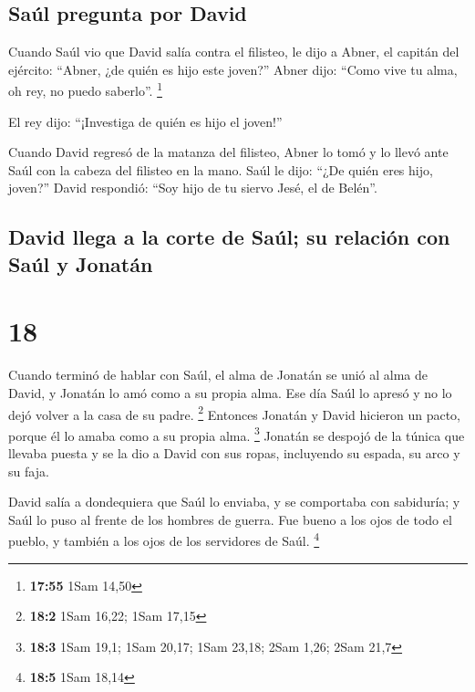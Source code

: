 \hypertarget{sauxfal-pregunta-por-david}{%
\subsection{Saúl pregunta por David}\label{sauxfal-pregunta-por-david}}

 Cuando Saúl vio que David salía contra el filisteo, le
dijo a Abner, el capitán del ejército: ``Abner, ¿de quién es hijo este
joven?'' Abner dijo: ``Como vive tu alma, oh rey, no puedo saberlo''.
\footnote{\textbf{17:55} 1Sam 14,50}

 El rey dijo: ``¡Investiga de quién es hijo el joven!''

 Cuando David regresó de la matanza del filisteo, Abner
lo tomó y lo llevó ante Saúl con la cabeza del filisteo en la mano.
 Saúl le dijo: ``¿De quién eres hijo, joven?'' David
respondió: ``Soy hijo de tu siervo Jesé, el de Belén''.

\hypertarget{david-llega-a-la-corte-de-sauxfal-su-relaciuxf3n-con-sauxfal-y-jonatuxe1n}{%
\subsection{David llega a la corte de Saúl; su relación con Saúl y
Jonatán}\label{david-llega-a-la-corte-de-sauxfal-su-relaciuxf3n-con-sauxfal-y-jonatuxe1n}}

\hypertarget{section-17}{%
\section{18}\label{section-17}}

 Cuando terminó de hablar con Saúl, el alma de Jonatán se
unió al alma de David, y Jonatán lo amó como a su propia alma.
 Ese día Saúl lo apresó y no lo dejó volver a la casa de
su padre. \footnote{\textbf{18:2} 1Sam 16,22; 1Sam 17,15} 
Entonces Jonatán y David hicieron un pacto, porque él lo amaba como a su
propia alma. \footnote{\textbf{18:3} 1Sam 19,1; 1Sam 20,17; 1Sam 23,18;
  2Sam 1,26; 2Sam 21,7}  Jonatán se despojó de la túnica
que llevaba puesta y se la dio a David con sus ropas, incluyendo su
espada, su arco y su faja.

 David salía a dondequiera que Saúl lo enviaba, y se
comportaba con sabiduría; y Saúl lo puso al frente de los hombres de
guerra. Fue bueno a los ojos de todo el pueblo, y también a los ojos de
los servidores de Saúl. \footnote{\textbf{18:5} 1Sam 18,14}

